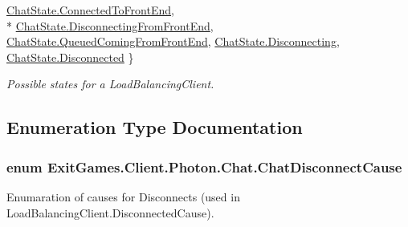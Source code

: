 \begin{DoxyCompactItemize}
\hyperlink{namespace_exit_games_1_1_client_1_1_photon_1_1_chat_ad7d7f22d8741237f41e4b60779cdfa19a47d270be4d53cc3a1bc56b9eb1c36595}{Chat\+State.\+Connected\+To\+Front\+End}, 
\\*
\hyperlink{namespace_exit_games_1_1_client_1_1_photon_1_1_chat_ad7d7f22d8741237f41e4b60779cdfa19ab9ef7abda3055a11dd964fd93a07dc40}{Chat\+State.\+Disconnecting\+From\+Front\+End}, 
\hyperlink{namespace_exit_games_1_1_client_1_1_photon_1_1_chat_ad7d7f22d8741237f41e4b60779cdfa19ad61e8ad0770b4d06dc1716dfce52751e}{Chat\+State.\+Queued\+Coming\+From\+Front\+End}, 
\hyperlink{namespace_exit_games_1_1_client_1_1_photon_1_1_chat_ad7d7f22d8741237f41e4b60779cdfa19a10b0501000c144cb2a7424bd45e1bcde}{Chat\+State.\+Disconnecting}, 
\hyperlink{namespace_exit_games_1_1_client_1_1_photon_1_1_chat_ad7d7f22d8741237f41e4b60779cdfa19aef70e46fd3bbc21e3e1f0b6815e750c0}{Chat\+State.\+Disconnected}
 \}\begin{DoxyCompactList}\small\item\em Possible states for a Load\+Balancing\+Client.\end{DoxyCompactList}
\end{DoxyCompactItemize}


\subsection{Enumeration Type Documentation}
\subsubsection[{\texorpdfstring{Chat\+Disconnect\+Cause}{ChatDisconnectCause}}]{\setlength{\rightskip}{0pt plus 5cm}enum {\bf Exit\+Games.\+Client.\+Photon.\+Chat.\+Chat\+Disconnect\+Cause}\hspace{0.3cm}{\ttfamily [strong]}}\hypertarget{namespace_exit_games_1_1_client_1_1_photon_1_1_chat_ae3a2988c8cb1fea31bb2d9eeafc0ed8b}{}\label{namespace_exit_games_1_1_client_1_1_photon_1_1_chat_ae3a2988c8cb1fea31bb2d9eeafc0ed8b}


Enumaration of causes for Disconnects (used in Load\+Balancing\+Client.\+Disconnected\+Cause). 

